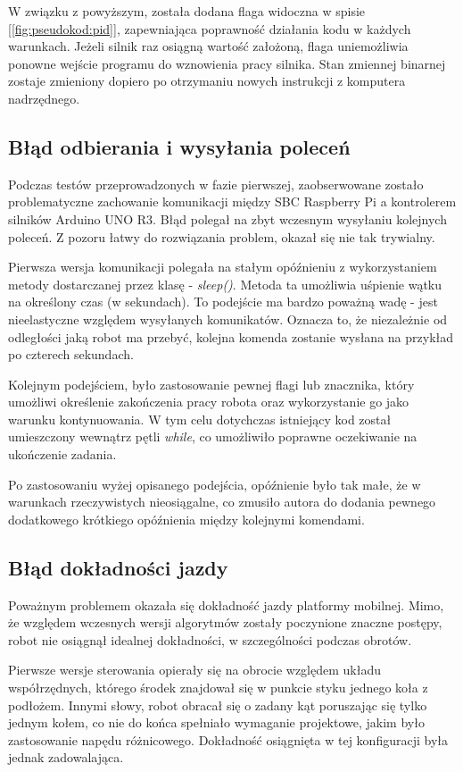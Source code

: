W związku z powyższym, została dodana flaga widoczna w spisie [\ref{fig:pseudokod:pid}], zapewniająca poprawność działania kodu w każdych warunkach. Jeżeli silnik raz osiągną wartość założoną, flaga uniemożliwia ponowne wejście programu do wznowienia pracy silnika. Stan zmiennej binarnej zostaje zmieniony dopiero po otrzymaniu nowych instrukcji z komputera nadrzędnego. 

\subsection{Błąd odbierania i wysyłania poleceń}
Podczas testów przeprowadzonych w fazie pierwszej, zaobserwowane zostało problematyczne zachowanie komunikacji między SBC Raspberry Pi a kontrolerem silników Arduino UNO R3. Błąd polegał na zbyt wczesnym wysyłaniu kolejnych poleceń. Z pozoru łatwy do rozwiązania problem, okazał się nie tak trywialny. 

Pierwsza wersja komunikacji polegała na stałym opóźnieniu z wykorzystaniem metody dostarczanej przez klasę  - \textit{sleep()}. Metoda ta umożliwia uśpienie wątku na określony czas (w sekundach). To podejście ma bardzo poważną wadę - jest nieelastyczne względem wysyłanych komunikatów. Oznacza to, że niezależnie od odległości jaką robot ma przebyć, kolejna komenda zostanie wysłana na przykład po czterech sekundach. 

Kolejnym podejściem, było zastosowanie pewnej flagi lub znacznika, który umożliwi określenie zakończenia pracy robota oraz wykorzystanie go jako warunku kontynuowania. W tym celu dotychczas istniejący kod został umieszczony wewnątrz pętli \textit{while}, co umożliwiło poprawne oczekiwanie na ukończenie zadania. 

Po zastosowaniu wyżej opisanego podejścia, opóźnienie było tak małe, że w warunkach rzeczywistych nieosiągalne, co zmusiło autora do dodania pewnego dodatkowego krótkiego opóźnienia między kolejnymi komendami. 

\subsection{Błąd dokładności jazdy}

Poważnym problemem okazała się dokładność jazdy platformy mobilnej. Mimo, że względem wczesnych wersji algorytmów zostały poczynione znaczne postępy, robot nie osiągnął idealnej dokładności, w szczególności podczas obrotów. 

Pierwsze wersje sterowania opierały się na obrocie względem układu współrzędnych, którego środek znajdował się w punkcie styku jednego koła z podłożem. Innymi słowy, robot obracał się o zadany kąt poruszając się tylko jednym kołem, co nie do końca spełniało wymaganie projektowe, jakim było zastosowanie napędu różnicowego. Dokładność osiągnięta w tej konfiguracji była jednak zadowalająca. 

